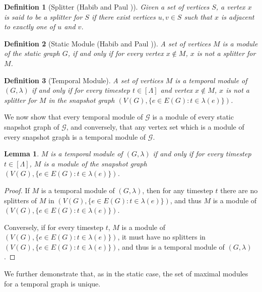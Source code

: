 \documentclass[preprint,12pt]{elsarticle}
\newtheorem{lemma}{Lemma}
\newtheorem{definition}{Definition}
\begin{document}
\begin{definition}[Splitter (Habib and Paul \cite{DBLP:journals/csr/HabibP10})]
    Given a set of vertices $S$, a vertex $x$ is said to be a \emph{splitter} for $S$ if there exist vertices $u, v \in S$ such that $x$ is adjacent to exactly one of $u$ and $v$.
\end{definition}

\begin{definition}[Static Module (Habib and Paul \cite{DBLP:journals/csr/HabibP10})]
    A set of vertices $M$ is a \emph{module} of the static graph $G$, if and only if for every vertex $x \notin M$, $x$ is not a splitter for $M$.
\end{definition}

\begin{definition}[Temporal Module]
    A set of vertices $M$ is a \emph{temporal module} of $(G, \lambda)$ if and only if for every timestep $t \in [\Lambda]$ and vertex $x \notin M$, $x$ is not a splitter for $M$ in the snapshot graph $(V(G), \{e \in E(G) : t \in \lambda(e) \})$.
\end{definition}

We now show that every temporal module of $\mathcal{G}$ is a module of every static snapshot graph of $\mathcal{G}$, and conversely, that any vertex set which is a module of every snapshot graph is a temporal module of $\mathcal{G}$.

\begin{lemma}
    \label{lem:modsnap1}
    $M$ is a temporal module of $(G, \lambda)$ if and only if for every timestep $t \in [\Lambda]$, $M$ is a module of the snapshot graph $(V(G), \{e \in E(G) : t \in \lambda(e) \})$.
\end{lemma}
\begin{proof}
    If $M$ is a temporal module of $(G, \lambda)$, then for any timestep $t$ there are no splitters of $M$ in $(V(G), \{e \in E(G) : t \in \lambda(e) \})$, and thus $M$ is a module of $(V(G), \{e \in E(G) : t \in \lambda(e) \})$.

    Conversely, if for every timestep $t$, $M$ is a module of $(V(G), \{e \in E(G) : t \in \lambda(e) \})$, it must have no splitters in $(V(G), \{e \in E(G) : t \in \lambda(e) \})$, and thus is a temporal module of $(G, \lambda)$.
\end{proof}

We further demonstrate that, as in the static case, the set of maximal modules for a temporal graph is unique.
\end{document}
